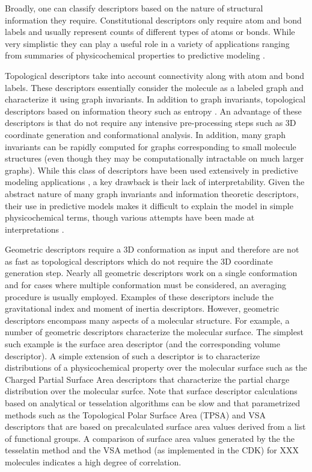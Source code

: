 \documentclass[letterpaper, 12pt]{article}
\begin{document}
Broadly, one can classify descriptors based on the nature of
structural information they require. Constitutional descriptors only
require atom and bond labels and usually represent counts of different
types of atoms or bonds. While very simplistic they can play a useful
role in a variety of applications ranging from summaries of
physicochemical properties to predictive modeling
\cite{Bender:2005aa}.  

Topological descriptors take into account connectivity along with atom
and bond labels. These descriptors essentially consider the molecule
as a labeled graph and characterize it using graph invariants. In
addition to graph invariants, topological descriptors based on
information theory such as entropy \cite{Dehmer:2009uq}. An advantage
of these descriptors is that do not require any intensive
pre-processing steps such as 3D coordinate generation and
conformational analysis. In addition, many graph invariants can be
rapidly computed for graphs corresponding to small molecule structures
(even though they may be computationally intractable on much larger
graphs). While this class of descriptors have been used extensively in
predictive modeling applications
\cite{Garcia-Domenech:2008aa,Randic:2001ac,Randic:2001ad,Besalu:2001aa,jcics:1995:35:272,Kier:1986ae},
a key drawback is their lack of interpretability. Given the abstract
nature of many graph invariants and information theoretic descriptors,
their use in predictive models makes it difficult to explain the model
in simple physicochemical terms, though various attempts have been  
made at interpretations \cite{Todeschini:1975dq,Stanton:2003aa}.

Geometric descriptors require a 3D conformation as input and therefore
are not as fast as topological descriptors which do not require the 3D
coordinate generation step. Nearly all geometric descriptors work on a
single conformation and for cases where multiple conformation must be
considered, an averaging procedure is usually employed. Examples of
these descriptors include the gravitational index
\cite{Katritzky:1996ly} and moment of inertia descriptors. However,
geometric descriptors encompass many aspects of a molecular
structure. For example, a number of geometric descriptors characterize
the molecular surface. The simplest such example is the surface area
descriptor (and the corresponding volume descriptor). A simple
extension of such a descriptor is to characterize distributions of a
physicochemical property over the molecular surface such as the
Charged Partial Surface Area descriptors \cite{Stanton:1990aa} that
characterize the partial charge distribution over the molecular
surfce. Note that surface descriptor calculations based on analytical
\cite{Connolly:1983aa} or tesselation algorithms
\cite{Eisenhaber:1995qf} can be slow and that parametrized methods
such as the Topological Polar Surface Area (TPSA) \cite{Ertl:2000aa}
and VSA descriptors \cite{Labute:2008aa} that are based on
precalculated surface area values derived from a list of functional
groups. A comparison of surface area values generated by the the
tesselatin method and the VSA method (as implemented in the CDK) for
XXX molecules indicates a high degree of correlation.
\end{document}

